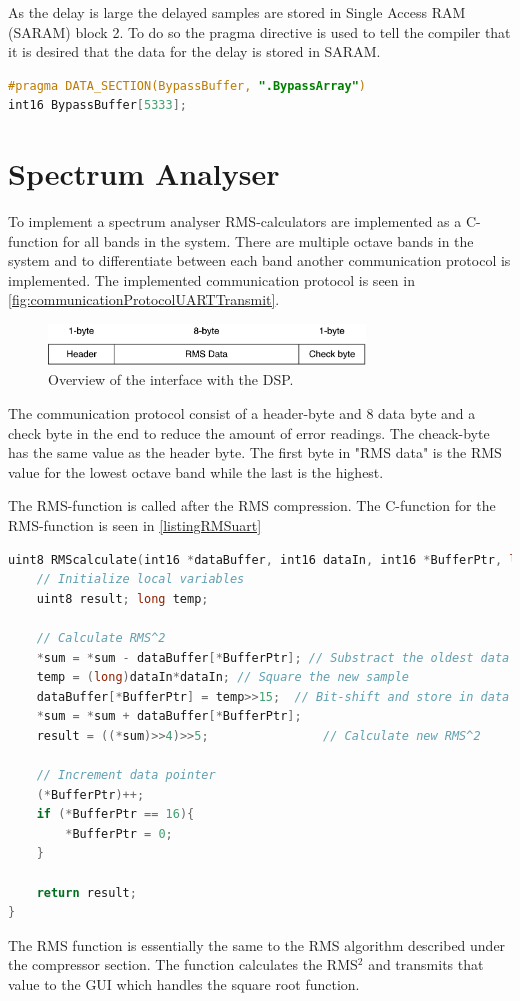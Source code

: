 As the delay is large the delayed samples are stored in Single Access RAM (SARAM) block 2. To do so the pragma directive is used to tell the compiler that it is desired that the data for the delay is stored in SARAM.

\begin{lstlisting}[language=C, caption = {Pragma for delay buffer for bypass.},label={listingPragma}]
#pragma DATA_SECTION(BypassBuffer, ".BypassArray")
int16 BypassBuffer[5333];
\end{lstlisting}


\section{Spectrum Analyser}

To implement a spectrum analyser RMS-calculators are implemented as a C-function for all bands in the system. There are multiple octave bands in the system and to differentiate between each band another communication protocol is implemented. The implemented communication protocol is seen in \autoref{fig:communicationProtocolUARTTransmit}.

\begin{figure}[H]
\centering
\includegraphics[width=0.75\textwidth]{figures/communicationProtocolUARTTransmit.pdf}
\caption{Overview of the interface with the DSP.}
\label{fig:communicationProtocolUARTTransmit}
\end{figure}

The communication protocol consist of a header-byte and 8 data byte and a check byte in the end to reduce the amount of error readings. The cheack-byte has the same value as the header byte. The first byte in "RMS data" is the RMS value for the lowest octave band while the last is the highest.

The RMS-function is called after the RMS compression. The C-function for the RMS-function is seen in \autoref{listingRMSuart}

\begin{lstlisting}[language=C, caption = {Calculate RMS value},label={listingRMSuart}]
uint8 RMScalculate(int16 *dataBuffer, int16 dataIn, int16 *BufferPtr, long *sum){
	// Initialize local variables
	uint8 result; long temp;
	
	// Calculate RMS^2
	*sum = *sum - dataBuffer[*BufferPtr]; // Substract the oldest data from sum
	temp = (long)dataIn*dataIn;	// Square the new sample
	dataBuffer[*BufferPtr] = temp>>15;	// Bit-shift and store in data buffer
	*sum = *sum + dataBuffer[*BufferPtr];
	result = ((*sum)>>4)>>5;				// Calculate new RMS^2
	
	// Increment data pointer
	(*BufferPtr)++;
	if (*BufferPtr == 16){ 
		*BufferPtr = 0;
	}
	
	return result;
}
\end{lstlisting}

The RMS function is essentially the same to the RMS algorithm described under the compressor section. The function calculates the RMS$^2$ and transmits that value to the GUI which handles the square root function.


